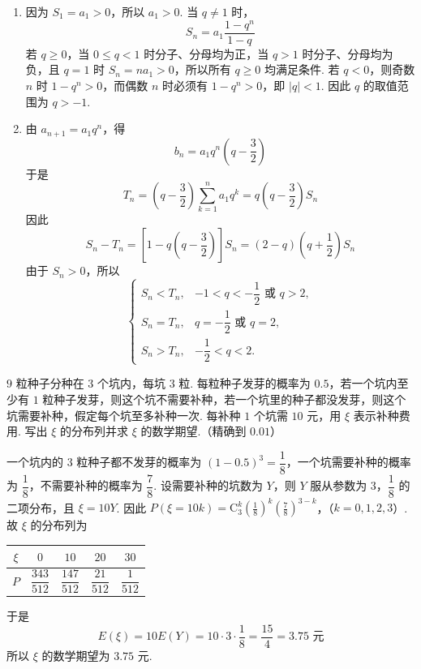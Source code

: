 \begin{solution}
\begin{enumerate}
\item 因为 \(S_1=a_1>0\)，所以 \(a_1>0\). 当 \(q\ne1\) 时，
\[
S_n=a_1\frac{1-q^n}{1-q}
\]
若 \(q\geqslant0\)，当 \(0\leqslant q<1\) 时分子、分母均为正，当 \(q>1\) 时分子、分母均为负，且 \(q=1\) 时 \(S_n=na_1>0\)，所以所有 \(q\geqslant0\) 均满足条件. 若 \(q<0\)，则奇数 \(n\) 时 \(1-q^n>0\)，而偶数 \(n\) 时必须有 \(1-q^n>0\)，即 \(|q|<1\). 因此 \(q\) 的取值范围为 \(q>-1\).
\item 由 \(a_{n+1}=a_1q^n\)，得
\[
b_n=a_1q^n\left(q-\frac{3}{2}\right)
\]
于是
\[
T_n=\left(q-\frac{3}{2}\right)\sum_{k=1}^{n}a_1q^k=q\left(q-\frac{3}{2}\right)S_n
\]
因此
\[
S_n-T_n=\left[1-q\left(q-\frac{3}{2}\right)\right]S_n=\left(2-q\right)\left(q+\frac{1}{2}\right)S_n
\]
由于 \(S_n>0\)，所以
\[
\begin{cases}
S_n<T_n,&-1<q<-\dfrac{1}{2}\text{ 或 }q>2,\\
S_n=T_n,&q=-\dfrac{1}{2}\text{ 或 }q=2,\\
S_n>T_n,&-\dfrac{1}{2}<q<2.
\end{cases}
\]
\end{enumerate}
\end{solution}

\begin{problem}
\(9\) 粒种子分种在 \(3\) 个坑内，每坑 \(3\) 粒. 每粒种子发芽的概率为 \(0.5\)，若一个坑内至少有 \(1\) 粒种子发芽，则这个坑不需要补种，若一个坑里的种子都没发芽，则这个坑需要补种，假定每个坑至多补种一次. 每补种 \(1\) 个坑需 \(10\text{ 元}\)，用 \(\xi\) 表示补种费用. 写出 \(\xi\) 的分布列并求 \(\xi\) 的数学期望.（精确到 \(0.01\)）
\end{problem}

\begin{solution}
一个坑内的 \(3\) 粒种子都不发芽的概率为 \(\left(1-0.5\right)^3=\dfrac{1}{8}\)，一个坑需要补种的概率为 \(\dfrac{1}{8}\)，不需要补种的概率为 \(\dfrac{7}{8}\). 设需要补种的坑数为 \(Y\)，则 \(Y\) 服从参数为 \(3\)，\(\dfrac{1}{8}\) 的二项分布，且 \(\xi=10Y\). 因此
\(P(\xi=10k)=\mathrm C_3^k\left(\frac{1}{8}\right)^k\left(\frac{7}{8}\right)^{3-k}\)，（\(k=0,1,2,3\)）.
故 \(\xi\) 的分布列为
\begin{center}
\begin{tabular}{c|cccc}
\(\xi\) & \(0\) & \(10\) & \(20\) & \(30\) \\
\hline
\(P\) & \(\dfrac{343}{512}\) & \(\dfrac{147}{512}\) & \(\dfrac{21}{512}\) & \(\dfrac{1}{512}\)
\end{tabular}
\end{center}
于是
\[
E(\xi)=10E(Y)=10\cdot3\cdot\frac{1}{8}=\frac{15}{4}=3.75\text{ 元}
\]
所以 \(\xi\) 的数学期望为 \(3.75\text{ 元}\).
\end{solution}

